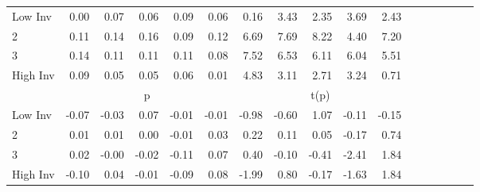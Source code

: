 \begin{table}[!ht]
\begin{tabular}{lrrrrrrrrrrrrrrrr}
    \\
      \cmidrule(r){2-5} \cmidrule(r){6-9} \cmidrule(r){10-13} \cmidrule(r){14-17}

    Low Inv   & 0.00  & 0.07  & 0.06  & 0.09  & 0.06  & 0.16  & 3.43  & 2.35  & 3.69  & 2.43  \\
           2  & 0.11  & 0.14  & 0.16  & 0.09  & 0.12  & 6.69  & 7.69  & 8.22  & 4.40  & 7.20  \\
           3  & 0.14  & 0.11  & 0.11  & 0.11  & 0.08  & 7.52  & 6.53  & 6.11  & 6.04  & 5.51  \\
    High Inv  & 0.09  & 0.05  & 0.05  & 0.06  & 0.01  & 4.83  & 3.11  & 2.71  & 3.24  & 0.71  \\

  
    
      & \multicolumn{5}{c}{p} & \multicolumn{5}{c}{t(p)}
    
    \\
      \cmidrule(r){2-5} \cmidrule(r){6-9} \cmidrule(r){10-13} \cmidrule(r){14-17}

    Low Inv   & -0.07  & -0.03  & 0.07  & -0.01  & -0.01  & -0.98  & -0.60  & 1.07  & -0.11  & -0.15  \\
           2  & 0.01  & 0.01  & 0.00  & -0.01  & 0.03  & 0.22  & 0.11  & 0.05  & -0.17  & 0.74  \\
           3  & 0.02  & -0.00  & -0.02  & -0.11  & 0.07  & 0.40  & -0.10  & -0.41  & -2.41  & 1.84  \\
    High Inv  & -0.10  & 0.04  & -0.01  & -0.09  & 0.08  & -1.99  & 0.80  & -0.17  & -1.63  & 1.84  \\

  

  \bottomrule
\end{tabular}
\label{tbl:25_Size_BM_Inv_B2016}
\end{table}